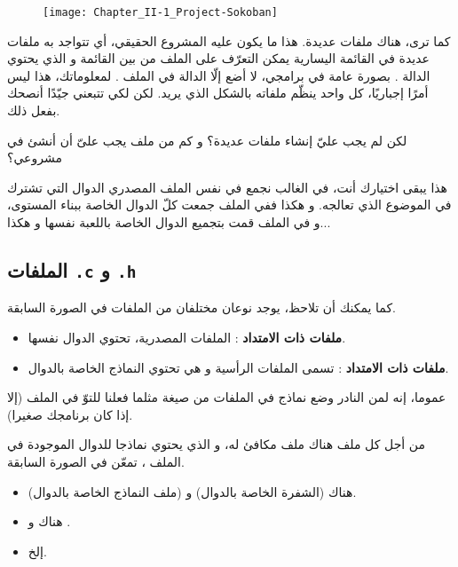 \begin{figure}[H]
	\centering
	\texttt{[image: Chapter\_II-1\_Project-Sokoban]}
\end{figure}

كما ترى، هناك ملفات عديدة. هذا ما يكون عليه المشروع الحقيقي، أي تتواجد به ملفات عديدة في القائمة اليسارية  يمكن التعرّف على الملف
من بين القائمة و الذي يحتوي الدالة
.
بصورة عامة في برامجي، لا أضع إلّا الدالة
في الملف
.
لمعلوماتك، هذا ليس أمرًا إجباريًا، كل واحد ينظّم ملفاته بالشكل الذي يريد. لكن لكي تتبعني جيّدًا أنصحك بفعل ذلك.

\begin{question}
  لكن لم يجب عليّ إنشاء ملفات عديدة؟ و كم من ملف يجب علىّ أن أنشئ في مشروعي؟
\end{question}

هذا يبقى اختيارك أنت، في الغالب نجمع في نفس الملف المصدري الدوال التي تشترك في الموضوع الذي تعالجه. و هكذا ففي الملف
جمعت كلّ الدوال الخاصة ببناء المستوى، و في الملف
قمت بتجميع الدوال الخاصة باللعبة نفسها و هكذا...

\subsection{الملفات \texttt{.c} و \texttt{.h}}

كما يمكنك أن تلاحظ، يوجد نوعان مختلفان من الملفات في الصورة السابقة.

\begin{itemize}
  \item \textbf{ملفات ذات الامتداد
}
: الملفات المصدرية، تحتوي الدوال نفسها.
  \item \textbf{ملفات ذات الامتداد
}
: تسمى الملفات الرأسية و هي تحتوي النماذج الخاصة بالدوال.
\end{itemize}

عموما، إنه لمن النادر وضع نماذج في الملفات من صيغة
مثلما فعلنا للتوّ في الملف
(إلا إذا كان برنامجك صغيرا).

من أجل كل ملف
هناك ملف مكافئ له، و الذي يحتوي نماذجا للدوال الموجودة في الملف
،
تمعّن في الصورة السابقة.

\begin{itemize}
  \item هناك
(الشفرة الخاصة بالدوال) و
(ملف النماذج الخاصة بالدوال).
  \item هناك
و
.
  \item إلخ.
\end{itemize}

